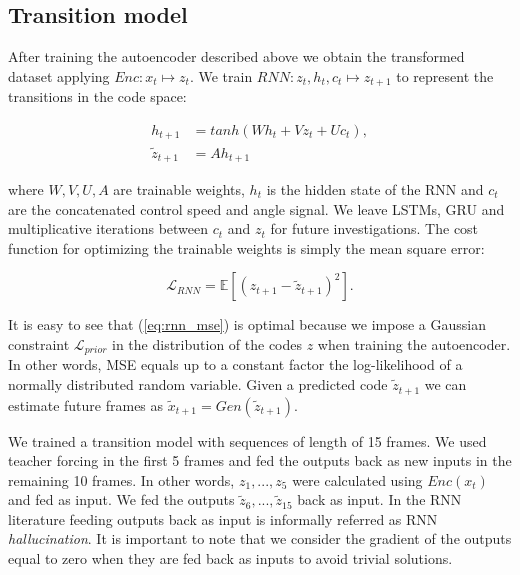 \documentclass{article} %
\begin{document}
\subsection{Transition model}
\label{sub:rnn}
After training the autoencoder described above we obtain the transformed dataset applying $Enc: x_t \mapsto z_t$. We train $RNN : z_t, h_t, c_t \mapsto z_{t+1}$ to
represent the transitions in the code space:

\begin{equation}
 \label{eq:rnn}
 \begin{split}
   h_{t+1} & = tanh\left( W h_t + V z_t + U c_t \right), \\
   \tilde{z}_{t+1} & = A h_{t+1}
 \end{split}
\end{equation}

where $W, V, U, A$ are trainable weights, $h_t$ is the hidden state of the RNN and $c_t$ are the concatenated control speed and angle signal.
We leave LSTMs, GRU and multiplicative iterations between $c_t$ and $z_t$ for future investigations.
The cost function for optimizing the trainable weights is simply the mean square error:

\begin{equation}
 \label{eq:rnn_mse}
 \mathcal{L}_{RNN} = \mathbb{E}\left[ (z_{t+1} - \tilde{z}_{t+1})^2 \right].
\end{equation}

It is easy to see that (\ref{eq:rnn_mse}) is optimal because we impose a Gaussian constraint $\mathcal{L}_{prior}$ in the distribution of the codes $z$ when training
the autoencoder. In other words, MSE equals up to a constant factor the log-likelihood of a normally distributed random variable.
Given a predicted code $\tilde{z}_{t+1}$ we can estimate future frames as $\tilde{x}_{t+1} = Gen(\tilde{z}_{t+1})$.

We trained a transition model with sequences of length of 15 frames. We used teacher forcing in the first 5 frames and fed the outputs back as new inputs in the remaining
10 frames. In other words, $z_1, ..., z_5$
were calculated using $Enc(x_t)$ and fed as input. We fed the outputs $\tilde{z}_{6}, ..., \tilde{z}_{15}$ back as input. In the RNN literature feeding outputs back
as input is informally referred as RNN \textit{hallucination}.
It is important to note that we consider the
gradient of the outputs equal to zero when they are fed back as inputs to avoid trivial solutions.
\end{document}
